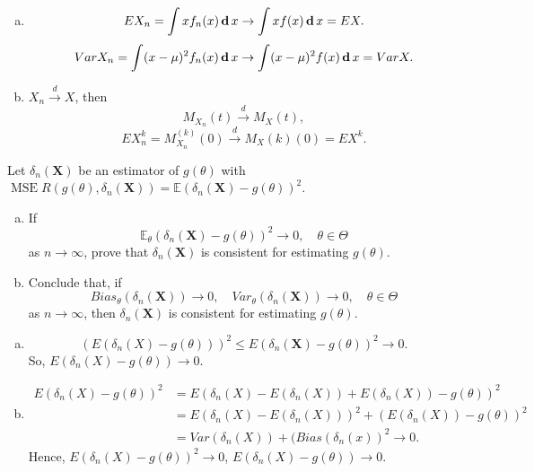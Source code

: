 \begin{solution}
    \begin{enumerate}[(a)]
        \item \begin{align*}
            EX_n =\int x f_n(x) \,\mathbf{d}\, x\to \int xf(x)\,\mathbf{d}\, x =EX. 
        \end{align*}
        \[
            VarX_n=\int (x-\mu)^2 f_n(x) \,\mathbf{d}\, x\to \int (x-\mu)^2f(x)\,\mathbf{d}\, x =VarX.
        \]
        \item $X_n\stackrel{d}{\to}X$, then
        \[
            M_{X_n}(t)\stackrel{d}{\to}M_X(t), 
        \]
        \[EX_n^k=M_{X_n}^{(k)}(0)\stackrel{d}{\to}M_X{(k)}(0)=EX^k. \]
    \end{enumerate}
\end{solution}

\begin{ex}
    Let \(\delta_{n}(\mathbf{X})\) be an estimator of \(g(\theta)\) with \(\operatorname{MSE} R\left(g(\theta), \delta_{n}(\mathbf{X})\right)=\mathbb{E}\left(\delta_{n}(\mathbf{X})-g(\theta)\right)^{2}\). 
    \begin{enumerate}[(a)]
        \item If
        \[
            \mathbb{E}_{\theta}\left(\delta_{n}(\mathbf{X})-g(\theta)\right)^{2} \rightarrow 0, \quad \theta \in \Theta
        \]
        as \(n \rightarrow \infty\), prove that \(\delta_{n}(\mathbf{X})\) is consistent for estimating \(g(\theta)\). 
        \item Conclude that, if
        \[
            Bias_{\theta}\left(\delta_{n}(\mathbf{X})\right) \rightarrow 0, \quad Var_{\theta}\left(\delta_{n}(\mathbf{X})\right) \rightarrow 0, \quad \theta \in \Theta
        \]
        as \(n \rightarrow \infty\), then \(\delta_{n}(\mathbf{X})\) is consistent for estimating \(g(\theta)\). 
    \end{enumerate}
\end{ex}

\begin{solution}
    \begin{enumerate}[(a)]
        \item \[
            (E(\delta_n(X)-g(\theta)))^2\leqslant E(\delta_{n}(\mathbf{X})-g(\theta))^2\to 0. 
        \]
        So, $E(\delta_n(X)-g(\theta))\to0$. 
        \item \begin{align*}
            E(\delta_n(X)-g(\theta))^2&=E(\delta_{n}(X)-E(\delta_n(X))+E(\delta_n(X))-g(\theta))^2\\
            &=E(\delta_{n}(X)-E(\delta_n(X)))^2+(E(\delta_n(X))-g(\theta))^2\\
            &=Var(\delta_n(X))+(Bias(\delta_n(x))^2\to 0. 
        \end{align*}
        Hence, $E(\delta_n(X)-g(\theta))^2\to 0$, $E(\delta_n(X)-g(\theta))\to0$. 
    \end{enumerate}
    
\end{solution}

